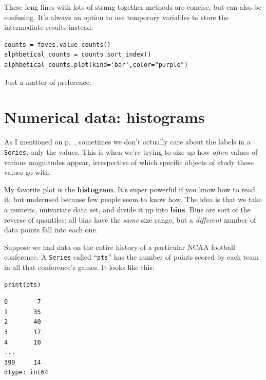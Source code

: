 These long lines with lots of strung-together methods are concise, but can also
be confusing. It's always an option to use temporary variables to store the
intermediate results instead:

\begin{Verbatim}[fontsize=\small,samepage=true,frame=single,framesep=3mm]
counts = faves.value_counts()
alphbetical_counts = counts.sort_index()
alphbetical_counts.plot(kind='bar',color="purple")
\end{Verbatim}

Just a matter of preference.

\section{Numerical data: histograms}


As I mentioned on p.~\pageref{twoWaysToPlotUnivariateData}, sometimes we don't
actually care about the labels in a \texttt{Series}, only the values. This is
when we're trying to size up how \textit{often} values of various magnitudes
appear, irrespective of which specific objects of study those values go with.


My favorite plot is the \textbf{histogram}. It's super powerful if you know how
to read it, but underused because few people seem to know how. The idea is that
we take a numeric, univariate data set, and divide it up into \textbf{bins}.
Bins are sort of the reverse of quantiles: all bins have the \textit{same} size
range, but a \textit{different} number of data points fall into each one.

\label{NCAAData}

Suppose we had data on the entire history of a particular NCAA football
conference. A \texttt{Series} called ``\texttt{pts}'' has the number of points
scored by each team in all that conference's games. It looks like this:

\begin{Verbatim}[fontsize=\small,samepage=true,frame=single,framesep=3mm]
print(pts)
\end{Verbatim}
\vspace{-.2in}

\begin{Verbatim}[fontsize=\small,samepage=true,frame=leftline,framesep=5mm,framerule=1mm]
0        7
1       35
2       40
3       17
4       10
...
399     14
dtype: int64
\end{Verbatim}

